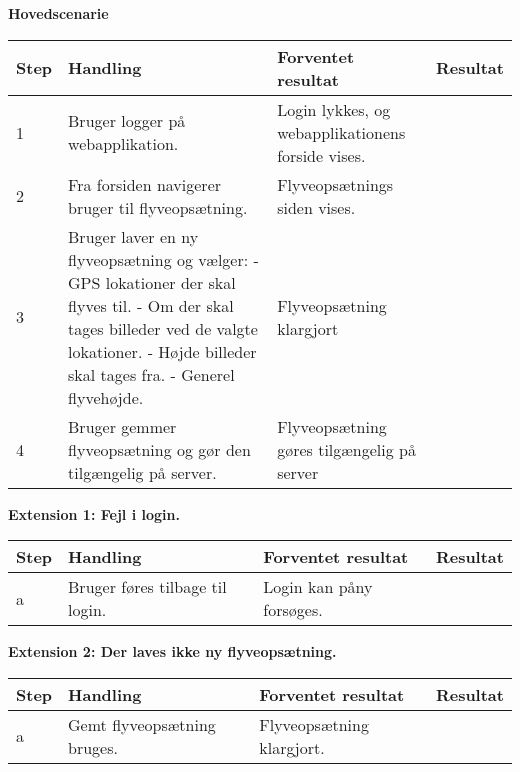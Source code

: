 \textbf{Hovedscenarie}
\begin{table}[H]
	\centering
		\begin{tabular}{|l|p{5 cm}|p{5 cm}|p{3.5 cm}|} 
		\hline
			Step & Handling & Forventet resultat & Resultat\\ \hline
			1 & Bruger logger på \newline webapplikation. & Login lykkes, og webapplikationens forside vises. &  \\ \hline
			2 & Fra forsiden navigerer bruger til flyveopsætning. & Flyveopsætnings siden vises. & \\ \hline
			3 & Bruger laver en ny \newline flyveopsætning og vælger: \newline
				- GPS lokationer der \newline skal flyves til. \newline
				- Om der skal tages billeder ved de valgte lokationer. \newline
				- Højde billeder skal tages fra. \newline
				- Generel flyvehøjde.				
				 & Flyveopsætning klargjort & \\ \hline
			4 & Bruger gemmer flyveopsætning og gør den tilgængelig på server. & Flyveopsætning gøres \newline tilgængelig på server & \\ \hline
		\end{tabular}
\end{table}

\textbf{Extension 1: Fejl i login.}
\begin{table}[H]
	\centering
		\begin{tabular}{|l|p{5 cm}|p{5 cm}|p{3.5 cm}|} 
		\hline
			Step & Handling & Forventet resultat & Resultat\\ \hline
			a & Bruger føres tilbage til login. & Login kan påny forsøges. & \\ \hline
		\end{tabular}
\end{table}

\textbf{Extension 2: Der laves ikke ny flyveopsætning.}
\begin{table}[H]
	\centering
		\begin{tabular}{|l|p{5 cm}|p{5 cm}|p{3.5 cm}|} 
		\hline
			Step & Handling & Forventet resultat & Resultat\\ \hline
			a & Gemt flyveopsætning bruges. & Flyveopsætning klargjort. & \\ \hline
		\end{tabular}
\end{table}

